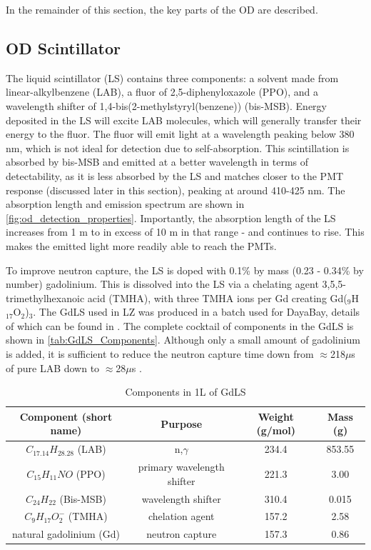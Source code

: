 \par
In the remainder of this section, the key parts of the OD are described.



\subsection{OD Scintillator}
\par
The liquid scintillator (LS) contains three components: a solvent made from linear-alkylbenzene (LAB), a fluor of 2,5-diphenyloxazole (PPO), and a wavelength shifter of 1,4-bis(2-methylstyryl(benzene)) (bis-MSB).
Energy deposited in the LS will excite LAB molecules, which will generally transfer their energy to the fluor. 
The fluor will emit light at a wavelength peaking below 380 nm, which is not ideal for detection due to self-absorption.
This scintillation is absorbed by bis-MSB and emitted at a better wavelength in terms of detectability, as it is less absorbed by the LS and matches closer to the PMT response (discussed later in this section), peaking at around 410-425 nm.
The absorption length and emission spectrum are shown in \autoref{fig:od_detection_properties}.
Importantly, the absorption length of the LS increases from 1 m to in excess of 10 m in that range - and continues to rise.
This makes the emitted light more readily able to reach the PMTs.



\par
To improve neutron capture, the LS is doped with 0.1\% by mass (0.23 - 0.34\% by number) gadolinium.
This is dissolved into the LS via a chelating agent 3,5,5-trimethylhexanoic acid (TMHA), with three TMHA ions per Gd creating Gd(${}_{9}$H${}_{17}$O${}_{2}$)${}_{3}$.
The GdLS used in LZ was produced in a batch used for DayaBay, details of which can be found in \cite{dayabay_gd_doping_ref}.
The complete cocktail of components in the GdLS is shown in \autoref{tab:GdLS_Components}.
Although only a small amount of gadolinium is added, it is sufficient to reduce the neutron capture time down from $\approx$218$\mu$s of pure LAB down to $\approx$28$\mu$s \cite{ucsb_gdls_dicebox_simulations_ref}.

\begin{table}
    \centering
    \begin{tabular}{c | c | c | c}
    \hline
    {Component (short name)} & {Purpose} & {Weight (g/mol)} & {Mass (g)} \\ \hline
    $C_{17.14}H_{28.28}$ (LAB) & n,$\gamma$ & 234.4  & 853.55 \\
    $C_{15}H_{11}NO$ (PPO) & primary wavelength shifter & 221.3 & 3.00 \\
    $C_{24}H_{22}$ (Bis-MSB) & wavelength shifter & 310.4 & 0.015 \\
    $C_{9}H_{17}O^{-}_{2}$ (TMHA) & chelation agent & 157.2 & 2.58 \\
    natural gadolinium (Gd) & neutron capture & 157.3 & 0.86 
    \end{tabular}
    \caption{Components in 1L of GdLS}
    \label{tab:GdLS_Components}
\end{table} 


